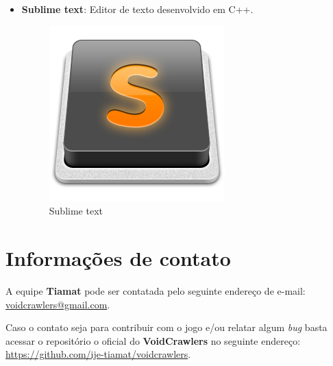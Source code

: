 \documentclass[11pt]{article} %
\begin{document}
\begin{itemize}
\item \textbf{Sublime text}: Editor de texto desenvolvido em C++.

\begin{figure}[!htp]
\centering
\includegraphics[scale=0.3]{imagens/Sublime_Text_Logo.png}
\caption{Sublime text}
\label{Sublime text}
\end{figure}

\end{itemize}

\section*{Informações de contato}
A equipe \textbf{Tiamat} pode ser contatada pelo seguinte endereço de e-mail: \url{voidcrawlers@gmail.com}.

Caso o contato seja para contribuir com o jogo e/ou relatar algum \textit{bug} basta acessar o repositório o oficial do \textbf{VoidCrawlers} no seguinte endereço: \url{https://github.com/ije-tiamat/voidcrawlers}.
\end{document}

